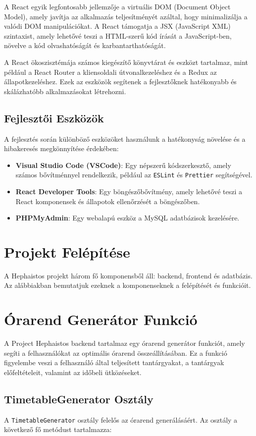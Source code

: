 \documentclass[colorlinks]{thesis-kando}
\theoremstyle{definition}
\theoremstyle{remark}
\begin{document}
A React egyik legfontosabb jellemzője a virtuális DOM (Document Object Model), amely javítja az alkalmazás teljesítményét azáltal, hogy minimalizálja a valódi DOM manipulációkat. A React támogatja a JSX (JavaScript XML) szintaxist, amely lehetővé teszi a HTML-szerű kód írását a JavaScript-ben, növelve a kód olvashatóságát és karbantarthatóságát.

A React ökoszisztémája számos kiegészítő könyvtárat és eszközt tartalmaz, mint például a React Router a kliensoldali útvonalkezeléshez és a Redux az állapotkezeléshez. Ezek az eszközök segítenek a fejlesztőknek hatékonyabb és skálázhatóbb alkalmazásokat létrehozni.

\subsection{Fejlesztői Eszközök}
A fejlesztés során különböző eszközöket használunk a hatékonyság növelése és a hibakeresés megkönnyítése érdekében:
\begin{itemize}
    \item \textbf{Visual Studio Code (VSCode)}: Egy népszerű kódszerkesztő, amely számos bővítménnyel rendelkezik, például az \texttt{ESLint} és \texttt{Prettier} segítségével.
    \item \textbf{React Developer Tools}: Egy böngészőbővítmény, amely lehetővé teszi a React komponensek és állapotok ellenőrzését a böngészőben.
    \item \textbf{PHPMyAdmin}: Egy webalapú eszköz a MySQL adatbázisok kezelésére.
\end{itemize}

\section{Projekt Felépítése}
A Hephaistos projekt három fő komponensből áll: backend, frontend és adatbázis. Az alábbiakban bemutatjuk ezeknek a komponenseknek a felépítését és funkcióit.

\section{Órarend Generátor Funkció}
A Project Hephaistos backend tartalmaz egy órarend generátor funkciót, amely segíti a felhasználókat az optimális órarend összeállításában. Ez a funkció figyelembe veszi a felhasználó által teljesített tantárgyakat, a tantárgyak előfeltételeit, valamint az időbeli ütközéseket.

\subsection{TimetableGenerator Osztály}
A \texttt{TimetableGenerator} osztály felelős az órarend generálásáért. Az osztály a következő fő metódust tartalmazza:
\end{document}
